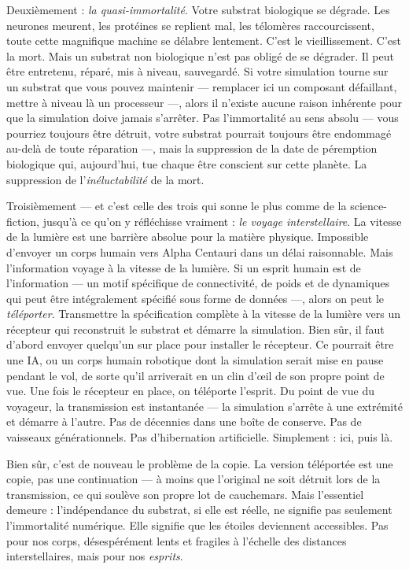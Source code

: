 \documentclass[11pt, twoside, openright]{book}
\begin{document}
Deuxièmement : \textit{la quasi-immortalité}. Votre substrat biologique se dégrade. Les neurones meurent, les protéines se replient mal, les télomères raccourcissent, toute cette magnifique machine se délabre lentement. C'est le vieillissement. C'est la mort. Mais un substrat non biologique n'est pas obligé de se dégrader. Il peut être entretenu, réparé, mis à niveau, sauvegardé. Si votre simulation tourne sur un substrat que vous pouvez maintenir --- remplacer ici un composant défaillant, mettre à niveau là un processeur ---, alors il n'existe aucune raison inhérente pour que la simulation doive jamais s'arrêter. Pas l'immortalité au sens absolu --- vous pourriez toujours être détruit, votre substrat pourrait toujours être endommagé au-delà de toute réparation ---, mais la suppression de la date de péremption biologique qui, aujourd'hui, tue chaque être conscient sur cette planète. La suppression de l'\textit{inéluctabilité} de la mort.

Troisièmement --- et c'est celle des trois qui sonne le plus comme de la science-fiction, jusqu'à ce qu'on y réfléchisse vraiment : \textit{le voyage interstellaire}. La vitesse de la lumière est une barrière absolue pour la matière physique. Impossible d'envoyer un corps humain vers Alpha Centauri dans un délai raisonnable. Mais l'information voyage à la vitesse de la lumière. Si un esprit humain est de l'information --- un motif spécifique de connectivité, de poids et de dynamiques qui peut être intégralement spécifié sous forme de données ---, alors on peut le \textit{téléporter}. Transmettre la spécification complète à la vitesse de la lumière vers un récepteur qui reconstruit le substrat et démarre la simulation. Bien sûr, il faut d'abord envoyer quelqu'un sur place pour installer le récepteur. Ce pourrait être une IA, ou un corps humain robotique dont la simulation serait mise en pause pendant le vol, de sorte qu'il arriverait en un clin d'œil de son propre point de vue. Une fois le récepteur en place, on téléporte l'esprit. Du point de vue du voyageur, la transmission est instantanée --- la simulation s'arrête à une extrémité et démarre à l'autre. Pas de décennies dans une boîte de conserve. Pas de vaisseaux générationnels. Pas d'hibernation artificielle. Simplement : ici, puis là.

Bien sûr, c'est de nouveau le problème de la copie. La version téléportée est une copie, pas une continuation --- à moins que l'original ne soit détruit lors de la transmission, ce qui soulève son propre lot de cauchemars. Mais l'essentiel demeure : l'indépendance du substrat, si elle est réelle, ne signifie pas seulement l'immortalité numérique. Elle signifie que les étoiles deviennent accessibles. Pas pour nos corps, désespérément lents et fragiles à l'échelle des distances interstellaires, mais pour nos \textit{esprits}.
\end{document}
